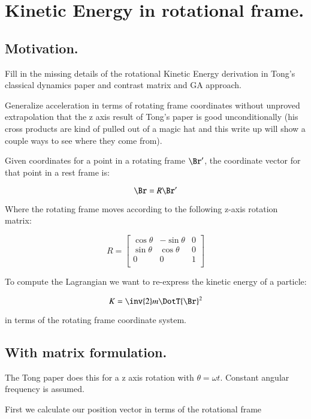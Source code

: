 \chapter{Kinetic Energy in rotational frame.}\label{chap:PJKeRot}

\section{Motivation. }

Fill in the missing details of the rotational Kinetic Energy derivation in Tong's classical
dynamics paper and contrast matrix and GA approach.

Generalize acceleration in terms
of rotating frame coordinates without unproved extrapolation that the z axis result
of Tong's paper is good unconditionally (his cross products are kind of pulled out of
a magic hat and this write up will show a couple ways to see where they come from).

Given coordinates for a point in a rotating frame $\Br'$, the coordinate vector for that point
in a rest frame is:

\begin{equation}\label{eqn:keRot:rotcoord}
\Br = R \Br'
\end{equation}

Where the rotating frame moves according to the following z-axis rotation matrix:

\[
R = 
\begin{bmatrix}
\cos \theta & -\sin \theta & 0 \\
\sin \theta & \cos \theta & 0 \\
0 & 0 & 1 \\
\end{bmatrix}
\]

To compute the Lagrangian we want to re-express the 
kinetic energy of a particle:

\[
K = 
\inv{2} m \DotT{\Br}^2
\]

in terms of the rotating frame coordinate system.

\section{With matrix formulation. }

The Tong paper does this for a z axis rotation with $\theta = \omega t$.
Constant angular frequency is assumed.

First we calculate our position vector in terms of the rotational frame

